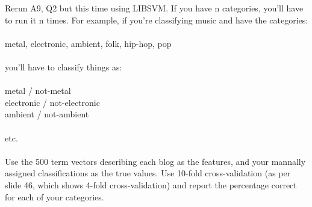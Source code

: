 Rerun A9, Q2 but this time using LIBSVM.  If you have n categories,
you'll have to run it n times.  For example, if you're classifying music
and have the categories:\\
\\
metal, electronic, ambient, folk, hip-hop, pop\\
\\
you'll have to classify things as:\\
\\
metal / not-metal\\
electronic / not-electronic\\
ambient / not-ambient\\
\\
etc.\\
\\
Use the 500 term vectors describing each blog as the features, and
your mannally assigned classifications as the true values.  Use
10-fold cross-validation (as per slide 46, which shows 4-fold
cross-validation) and report the percentage correct for 
each of your categories.\\